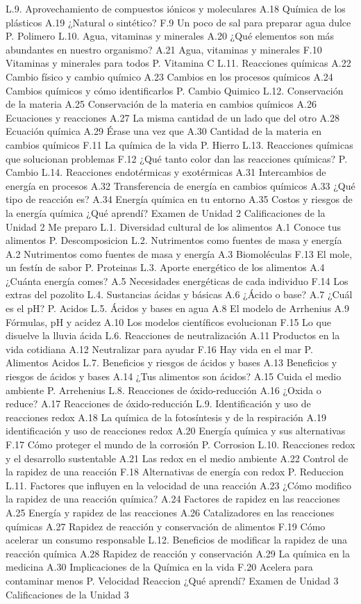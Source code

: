 L.9. Aprovechamiento de compuestos iónicos y moleculares
A.18 Química de los plásticos
A.19 ¿Natural o sintético?
F.9 Un poco de sal para preparar agua dulce
P. Polimero
L.10. Agua, vitaminas y minerales
A.20 ¿Qué elementos son más abundantes en nuestro organismo?
A.21 Agua, vitaminas y minerales
F.10 Vitaminas y minerales para todos
P. Vitamina C
L.11. Reacciones químicas
A.22 Cambio físico y cambio químico
A.23 Cambios en los procesos químicos
A.24 Cambios químicos y cómo identificarlos
P. Cambio Quimico
L.12. Conservación de la materia
A.25 Conservación de la materia en cambios químicos
A.26 Ecuaciones y reacciones
A.27 La misma cantidad de un lado que del otro
A.28 Ecuación química
A.29 Érase una vez que
A.30 Cantidad de la materia en cambios químicos
F.11 La química de la vida
P. Hierro
L.13. Reacciones químicas que solucionan problemas
F.12 ¿Qué tanto color dan las reacciones químicas?
P. Cambio
L.14. Reacciones endotérmicas y exotérmicas
A.31 Intercambios de energía en procesos
A.32 Transferencia de energía en cambios químicos
A.33 ¿Qué tipo de reacción es?
A.34 Energía química en tu entorno
A.35 Costos y riesgos de la energía química
¿Qué aprendí?
Examen de Unidad 2
Calificaciones de la Unidad 2
Me preparo
L.1. Diversidad cultural de los alimentos
A.1 Conoce tus alimentos
P. Descomposicion
L.2. Nutrimentos como fuentes de masa y energía
A.2 Nutrimentos como fuentes de masa y energía
A.3 Biomoléculas
F.13 El mole, un festín de sabor
P. Proteinas
L.3. Aporte energético de los alimentos
A.4 ¿Cuánta energía comes?
A.5 Necesidades energéticas de cada individuo
F.14 Los extras del pozolito
L.4. Sustancias ácidas y básicas
A.6 ¿Ácido o base?
A.7 ¿Cuál es el pH?
P. Acidos
L.5. Ácidos y bases en agua
A.8 El modelo de Arrhenius
A.9 Fórmulas, pH y acidez
A.10 Los modelos científicos evolucionan
F.15 Lo que disuelve la lluvia ácida
L.6. Reacciones de neutralización
A.11 Productos en la vida cotidiana
A.12 Neutralizar para ayudar
F.16 Hay vida en el mar
P. Alimentos Acidos
L.7. Beneficios y riesgos de ácidos y bases
A.13 Beneficios y riesgos de ácidos y bases
A.14 ¿Tus alimentos son ácidos?
A.15 Cuida el medio ambiente
P. Arrehenius
L.8. Reacciones de óxido-reducción
A.16 ¿Oxida o reduce?
A.17 Reacciones de óxido-reducción
L.9. Identificación y uso de reacciones redox
A.18 La química de la fotosíntesis y de la respiración
A.19 identificación y uso de reacciones redox
A.20 Energía química y sus alternativas
F.17 Cómo proteger el mundo de la corrosión
P. Corrosion
L.10. Reacciones redox y el desarrollo sustentable
A.21 Las redox en el medio ambiente
A.22 Control de la rapidez de una reacción
F.18 Alternativas de energía con redox
P. Reduccion
L.11. Factores que influyen en la velocidad de una reacción
A.23 ¿Cómo modifico la rapidez de una reacción química?
A.24 Factores de rapidez en las reacciones
A.25 Energía y rapidez de las reacciones
A.26 Catalizadores en las reacciones químicas
A.27 Rapidez de reacción y conservación de alimentos
F.19 Cómo acelerar un consumo responsable
L.12. Beneficios de modificar la rapidez de una reacción química
A.28 Rapidez de reacción y conservación
A.29 La química en la medicina
A.30 Implicaciones de la Química en la vida
F.20 Acelera para contaminar menos
P. Velocidad Reaccion
¿Qué aprendí?
Examen de Unidad 3
Calificaciones de la Unidad 3